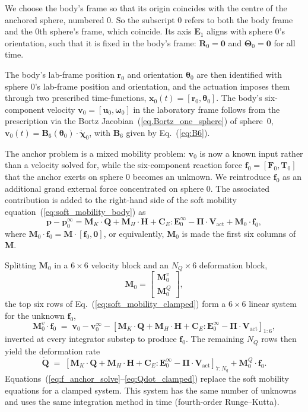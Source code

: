 \documentclass[aps,prfluids,groupedaddress]{revtex4-2}
\newcommand{\bff}{\bm{f}}
\newcommand{\bp}{\bm{p}}
\newcommand{\br}{\bm{r}}
\newcommand{\bu}{\bm{u}}
\newcommand{\bv}{\bm{v}}
\newcommand{\bx}{\bm{x}}
\newcommand{\bomega}{\bm{\omega}}
\newcommand{\btheta}{\bm{\theta}}
\newcommand{\bE}{\bm{E}}
\newcommand{\bF}{\bm{F}}
\newcommand{\bH}{\bm{H}}
\newcommand{\bQ}{\bm{Q}}
\newcommand{\bR}{\bm{R}}
\newcommand{\bT}{\bm{T}}
\newcommand{\bV}{\bm{V}}
\newcommand{\bTheta}{\bm{\Theta}}
\newcommand{\tB}{\bm{{B}}}
\newcommand{\tC}{\bm{{C}}}
\newcommand{\tE}{\bm{{E}}}
\newcommand{\tM}{\bm{{M}}}
\newcommand{\tPi}{\bm{{\Pi}}}
\newcommand{\bxd}{\bm{\dot \chi}}
\newcommand{\bQd}{\bm{{\dot Q}}}
\begin{document}
We choose the body's frame so that its origin coincides with the centre of the anchored sphere, numbered $0$. So the subscript $0$ refers to both the body frame and the $0$th sphere's frame, which coincide. Its axis $\bE_1$ aligns with sphere $0$'s orientation, such that it is fixed in the body's frame: $\bR_0 = \bm{0}$ and $\bTheta_0 = \bm{0}$ for all time. 

The body's lab-frame position $\br_0$ and orientation $\btheta_0$ are then identified with sphere $0$'s lab-frame position and orientation, and the actuation imposes them through two prescribed time-functions, $\bx_0(t)=[\br_0,\btheta_0]$. 
The body's six-component velocity $\bv_0 = [\bu_0,\bomega_0]$ in the laboratory frame follows from the prescription via the Bortz Jacobian~(\ref{eq.Bortz_one_sphere}) of sphere~$0$,
$\bv_0(t) = \tB_6(\btheta_0)\cdot\bxd_0$, with $\tB_6$ given by Eq.~(\ref{eq:B6}).


The anchor problem is a mixed mobility problem: $\bv_0$ is now a known input rather than a velocity solved for, while the six-component reaction force $\bff_0 = [\bF_0,\bT_0]$ that the anchor exerts on sphere $0$ becomes an unknown. We reintroduce $\bff_0$ as an additional grand external force concentrated on sphere $0$. The associated contribution is added to the right-hand side of the soft mobility equation~(\ref{eq:soft_mobility_body}) as 
\begin{equation}\label{eq:soft_mobility_clamped}
\bp - \bp_0^\infty
=
\tM_K\cdot\bQ + \tM_H\cdot\bH + \tC_E:\tE_0^\infty - \tPi\cdot\bV_\mathrm{act}
+ \tM_0\cdot\bff_0,
\end{equation}
where $\tM_0\cdot\bff_0 = \tM\cdot[\bff_0, \bm{0}]$, or equivalently, $\tM_0$ is made the first six columns of $\tM$.


Splitting $\tM_0$ in a $6\times 6$ velocity block and an $N_Q\times 6$ deformation block,
\begin{equation}\label{eq:M_anchor_partition}
\tM_0 =
\begin{bmatrix} \tM_0^{v} \\[0.5ex] \tM_0^{Q} \end{bmatrix},
\end{equation}
the top six rows of Eq.~(\ref{eq:soft_mobility_clamped}) form a $6\times 6$ linear system for the unknown $\bff_0$,
\begin{equation}\label{eq:f_anchor_solve}
\tM_0^{v}\cdot\bff_0
\;=\;
\bv_0 - \bv_0^\infty
- \left[\tM_K\cdot\bQ + \tM_H\cdot\bH + \tC_E:\tE_0^\infty - \tPi\cdot\bV_\mathrm{act}\right]_{1{:}6},
\end{equation}
inverted at every integrator substep to produce $\bff_0$. The remaining $N_Q$ rows then yield the deformation rate
\begin{equation}\label{eq:Qdot_clamped}
\bQd
\;=\;
\left[\tM_K\cdot\bQ + \tM_H\cdot\bH + \tC_E:\tE_0^\infty - \tPi\cdot\bV_\mathrm{act}\right]_{7{:}N_q}
+ \tM_0^{Q}\cdot\bff_0.
\end{equation}
Equations~(\ref{eq:f_anchor_solve}--\ref{eq:Qdot_clamped}) replace the soft mobility equations for a clamped system. This system has the same number of unknowns and uses the same integration method in time (fourth-order Runge--Kutta).  



\end{document}
